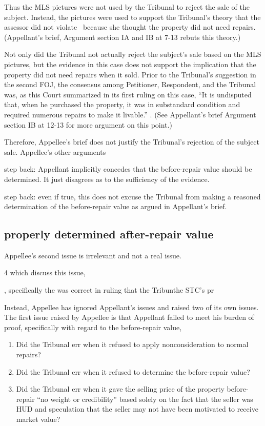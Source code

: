 \documentclass[12pt,\documentclassflag]{michiganCourtOfAppealsBrief}
\begin{document}
Thus the MLS pictures were not used by the Tribunal to reject the sale of the subject. Instead, the pictures were used to support the Tribunal's theory that the assessor did not violate \mathieuGast\ because she thought the property did not need repairs. (Appellant's brief, Argument section IA and IB at 7-13 rebuts this theory.)

Not only did the Tribunal not actually reject the subject's sale based on the MLS pictures, but the evidence in this case does not support the implication that the property did not need repairs when it sold. Prior to the Tribunal's suggestion in the second FOJ, the consensus among Petitioner, Respondent, and the Tribunal was, as this Court summarized in its first ruling on this case, ``It is undisputed that, when he purchased the property, it was in substandard condition and required numerous repairs to make it livable.'' . (See Appellant's brief Argument section IB at 12-13 for more argument on this point.)

Therefore, Appellee's brief does not justify the Tribunal's rejection of the subject sale.
Appellee's other arguments

step back: Appellant implicitly concedes that the before-repair value should be determined. It just disagrees as to the sufficiency of the evidence.

step back: even if true, this does not excuse the Tribunal from making a reasoned determination of the before-repair value as argued in Appellant's brief.

\subsection{properly determined after-repair value}

Appellee's second issue is irrelevant and not a real issue.



4 which discuss this issue, 

, specifically the was correct in ruling that the Tribunthe STC's pr




Instead, Appellee has ignored Appellant's issues and raised two of its own issues. The first issue raised by Appellee is that Appellant failed to meet his burden of proof, specifically with regard to the before-repair value,


\begin{enumerate}
  \item Did the Tribunal err when it refused to apply nonconsideration to normal repairs?
\item Did the Tribunal err when it refused to determine the before-repair value?
\item Did the Tribunal err when it gave the selling price of the property before-repair ``no weight or credibility'' based solely on the fact that the seller was HUD and speculation that the seller may not have been motivated to receive market value?
\end{enumerate}
\end{document}
